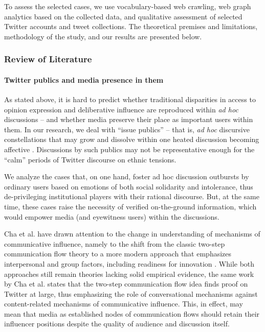 To assess the selected cases, we use vocabulary-based web crawling, web graph analytics based on the collected data, and qualitative assessment of selected Twitter accounts and tweet collections. The theoretical premises and limitations, methodology of the study, and our results are presented below.

\subsubsection{Review of Literature}

\paragraph{Twitter publics and media presence in them}
As stated above, it is hard to predict whether traditional disparities in access to opinion expression and deliberative influence are reproduced within \textit{ad hoc} discussions -- and whether media preserve their place as important users within them. In our research, we deal with “issue publics” \cite[p.~422]{Habermas}\cite[p.~108]{BrunsHighfeld2016} -- that is, \textit{ad hoc} discursive constellations \cite{BrunsBurgess} that may grow and dissolve within one heated discussion \cite[p.~74]{Dahlgren} becoming affective \cite{Papacharissi}. Discussions by such publics may not be representative enough for the “calm” periods of Twitter discourse on ethnic tensions.

We analyze the cases that, on one hand, foster ad hoc discussion outbursts by ordinary users based on emotions of both social solidarity and intolerance, thus de-privileging institutional players with their rational discourse. But, at the same time, these cases raise the necessity of verified on-the-ground information, which would empower media (and eyewitness users) within the discussions.

Cha et al. \cite{ChaHaddadiBenevenuto} have drawn attention to the change in understanding of mechanisms of communicative influence, namely to the shift from the classic two-step communication flow theory \cite{KatzLazarsfeld,Rogers} to a more modern approach that emphasizes interpersonal and group factors, including readiness for innovation \cite{DomingosRichardson,WattsDodds}. While both approaches still remain theories lacking solid empirical evidence, the same work by Cha et al. \cite{ChaHaddadiBenevenuto} states that the two-step communication flow idea finds proof on Twitter at large, thus emphasizing the role of conversational mechanisms against content-related mechanisms of communicative influence. This, in effect, may mean that media as established nodes of communication flows should retain their influencer positions despite the quality of audience and discussion itself.

